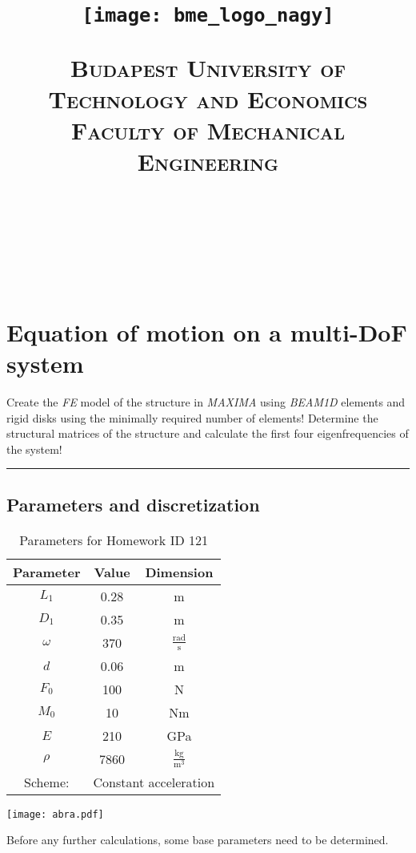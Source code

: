 \documentclass[12pt]{article}
\title{\centering \texttt{[image: bme\_logo\_nagy]}
\bigskip

\normalfont \normalsize \textsc{\centering Budapest University of Technology and Economics
\\ Faculty of Mechanical Engineering} \\ [12pt] \horrule{0.5pt} \\[0.4cm] \huge \HFCIME{} \\ \horrule{2pt} \\[0.5cm]}
\author{\NEV{}}
\newcommand{\horrule}[1]{\rule{\linewidth}{#1}}
\begin{document}

\pagebreak
\maketitle
\pagebreak

\pagebreak
\tableofcontents
\newpage
\section{Equation of motion on a multi-DoF system}
Create the \textit{FE} model of the structure in \textit{MAXIMA} using \textit{BEAM1D} elements and rigid disks using the minimally required number of elements! Determine the structural matrices of the structure and calculate the first four eigenfrequencies of the system!\\
\horrule{0.4pt}

\subsection{Parameters and discretization}

\begin{table}[hbt]
    \centering
    \begin{minipage}{0.45\textwidth}
        \centering
        \label{tab:data}
        \caption{Parameters for Homework ID 121}
        \begin{tabular}{ccc}
            Parameter & Value   & Dimension            \\ \hline
            $L_1$     & 0.28    & m                    \\
            $D_1$     & 0.35    & m                    \\
            $\omega$  & 370     & $\frac{\text{rad}}{\text{s}}$      \\
            $d$       & 0.06    & m                    \\
            $F_{0}$   & 100     & N                    \\
            $M_{0}$   & 10      & Nm                   \\
            $E$   & 210      & GPa                   \\
            $\rho$   & 7860      & $\frac{\text{kg}}{\text{m}^3}$                   \\[0.1cm] \hline
            Scheme:    & \multicolumn{2}{c}{Constant acceleration}
        \end{tabular}
    \end{minipage}%
    \begin{minipage}{0.55\textwidth}
        \centering
        \hspace{0.2cm}
        \texttt{[image: abra.pdf]}
        \label{fig:your-figure-label}
    \end{minipage}
\end{table}
Before any further calculations, some base parameters need to be determined.
\end{document}
